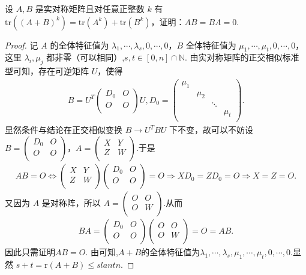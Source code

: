 \documentclass[../../main.tex]{subfiles}
\begin{document}
\begin{example}\label{example:例题611}
设 $A,B$ 是实对称矩阵且对任意正整数 $k$ 有 $\mathrm{tr}\left( \left( A+B \right) ^k \right) =\mathrm{tr}\left( A^k \right) +\mathrm{tr}\left( B^k \right) $，证明：$AB=BA=0$.
\end{example}
\begin{proof}
记 $A$ 的全体特征值为 $\lambda_1,\cdots,\lambda_s,0,\cdots,0$，$B$ 全体特征值为 $\mu_1,\cdots,\mu_t,0,\cdots,0$，这里 $\lambda_i,\mu_j$ 都非零（可以相同）,$s,t\in[0,n]\cap \mathbb{N}$.
由实对称矩阵的正交相似标准型可知，存在可逆矩阵 $U$，使得
\begin{align*}
B=U^T\begin{pmatrix}
D_0&		O\\
O&		O\\
\end{pmatrix} U,D_0=\begin{pmatrix}
\mu _1&		&		&		\\
&		\mu _2&		&		\\
&		&		\ddots&		\\
&		&		&		\mu _t\\
\end{pmatrix}.
\end{align*}
显然条件与结论在正交相似变换 $B\rightarrow U^TBU$ 下不变，故可以不妨设 $B=\begin{pmatrix}
D_0&		O\\
O&		O\\
\end{pmatrix}$，$A=\begin{pmatrix}
X&		Y\\
Z&		W\\
\end{pmatrix}$.于是
\begin{align*}
AB=O\Longleftrightarrow \begin{pmatrix}
X&		Y\\
Z&		W\\
\end{pmatrix} \begin{pmatrix}
D_0&		O\\
O&		O\\
\end{pmatrix} =O\Rightarrow XD_0=ZD_0=O\Rightarrow X=Z=O.
\end{align*}
又因为 $A$ 是对称阵，所以 $A=\begin{pmatrix}
O&		O\\
O&		W\\
\end{pmatrix}$.从而
\begin{align*}
BA = \begin{pmatrix}
D_0&		O\\
O&		O\\
\end{pmatrix}\begin{pmatrix}
O&		O\\
O&		W\\
\end{pmatrix} = O = AB.
\end{align*}
因此只需证明$AB=O$.
由可知,$A+B$的全体特征值为$\lambda _1,\cdots ,\lambda _s,\mu _1,\cdots ,\mu _t,0,\cdots ,0.$显然 $s+t=\mathrm{r}\left( A+B \right) \leqslant slant n$.


\end{proof}
\end{document}
